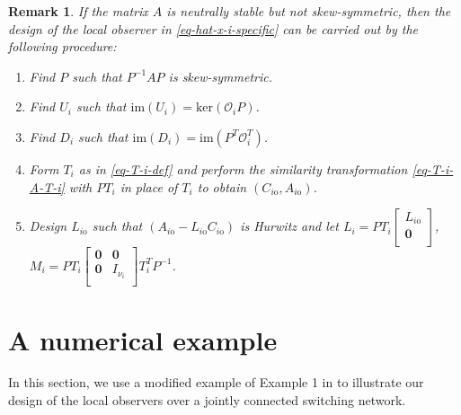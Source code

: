 \documentclass[twocolumn]{autart}
\newtheorem{Remark}{Remark}
\begin{document}
\begin{Remark}\label{Remark-design-procedure}
  If the matrix $A$ is neutrally stable but not skew-symmetric, then the design of the local observer
  in \eqref{eq-hat-x-i-specific} can be carried out by the following procedure:
  \begin{enumerate}
    \item Find $P$ such that $P^{-1}AP$ is skew-symmetric.

    \item Find $U_{i}$ such that $\text{im}(U_{i})=\text{ker}(\mathcal{O}_{i}P)$.

    \item Find $D_{i}$ such that $\text{im}(D_{i})=\text{im}(P^{T}\mathcal{O}_{i}^{T})$.

  \item Form $T_{i}$ as in \eqref{eq-T-i-def} and perform the similarity transformation \eqref{eq-T-i-A-T-i} with $PT_{i}$ in place of $T_{i}$ to obtain $(C_{i\text{o}}, A_{i\text{o}})$.

    \item Design $L_{i\text{o}}$ such that $(A_{i\text{o}}-L_{i\text{o}}C_{i\text{o}})$ is Hurwitz and let
    $L_{i}=PT_{i}\left[
                 \begin{array}{c}
                   L_{i\text{o}} \\
                   \mathbf{0} \\
                 \end{array}
               \right]$, $M_{i}=PT_{i} \left[
                                             \begin{array}{cc}
                                               \mathbf{0} & \mathbf{0} \\
                                               \mathbf{0} & I_{\nu_{i}} \\
                                             \end{array}
                                           \right]T_{i}^{T}P^{-1}$.
  \end{enumerate}
\end{Remark}





\section{A numerical example}\label{Section_Example}
In this section, we use a modified example of Example 1 in \cite{KimShim20} to illustrate our design of the local observers over a jointly connected  switching network.
\end{document}
